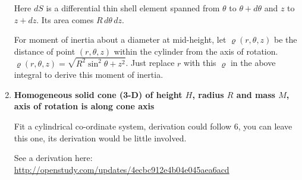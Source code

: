 \documentclass[a4paper,10pt]{article}
\begin{document}
\begin{enumerate}
Here $dS$ is a differential thin shell element spanned from $\theta$ to $\theta+d\theta$ and $z$ to $z+dz$. Its area comes $R\,d\theta \,dz$.

For moment of inertia about a diameter at mid-height, let $\varrho(r, \theta, z)$ be the distance of point $(r, \theta, z)$ within the cylinder from the axis of rotation. $\varrho(r, \theta, z) = \sqrt{R^2 \sin^2\theta + z^2}$. Just replace $r$ with this $\varrho$ in the above integral to derive this moment of inertia.

\item \textbf{Homogeneous solid cone (3-D) of height $H$, radius $R$ and mass $M$, axis of rotation is along cone axis}

Fit a cylindrical co-ordinate system, derivation could follow 6, you can leave this one, its derivation would be little involved. 

See a derivation here: \url{http://openstudy.com/updates/4ecbc912e4b04e045aea6acd}

\end{enumerate}
\end{document}
